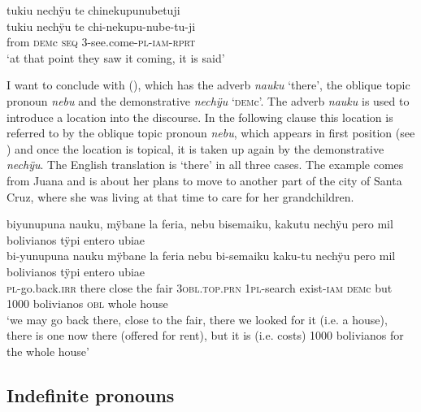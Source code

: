 \ea\label{ex:demC-3}
\begingl
\glpreamble tukiu nechÿu te chinekupunubetuji\\
\gla tukiu nechÿu te chi-nekupu-nube-tu-ji\\
\glb from \textsc{dem}c \textsc{seq} 3-see.come-\textsc{pl}-\textsc{iam}-\textsc{rprt}\\
\glft ‘at that point they saw it coming, it is said’
\endgl
\trailingcitation{[jxx-p151016l-2.110]}
\xe


I want to conclude with (), which has the adverb \textit{nauku} ‘there’, the oblique topic pronoun \textit{nebu} and the demonstrative \textit{nechÿu} ‘\textsc{dem}c’. The adverb \textit{nauku} is used to introduce a location into the discourse. In the following clause this location is referred to by the oblique topic pronoun \textit{nebu}, which appears in first position (see ) and once the location is topical, it is taken up again by the demonstrative \textit{nechÿu}. The English translation is ‘there’ in all three cases. The example comes from Juana and is about her plans to move to another part of the city of Santa Cruz, where she was living at that time to care for her grandchildren.

\ea\label{ex:demC-2}
\begingl
\glpreamble biyunupuna nauku, mÿbane la feria, nebu bisemaiku, kakutu nechÿu pero mil \\bolivianos tÿpi entero ubiae\\
\gla bi-yunupuna nauku mÿbane {la feria} nebu bi-semaiku kaku-tu nechÿu pero mil bolivianos tÿpi entero ubiae\\
\textsc{pl}-go.back.\textsc{irr} there close {the fair} 3\textsc{obl.top.prn} 1\textsc{pl}-search exist-\textsc{iam} \textsc{dem}c but 1000 bolivianos \textsc{obl} whole house\\
\glft ‘we may go back there, close to the fair, there we looked for it (i.e. a house), there is one now there (offered for rent), but it is (i.e. costs) 1000 bolivianos for the whole house’
\endgl
\trailingcitation{[jxx-p120430l-1.365-369]}
\xe




\largerpage
\subsection{Indefinite pronouns}\label{sec:IndefinitePronouns}

